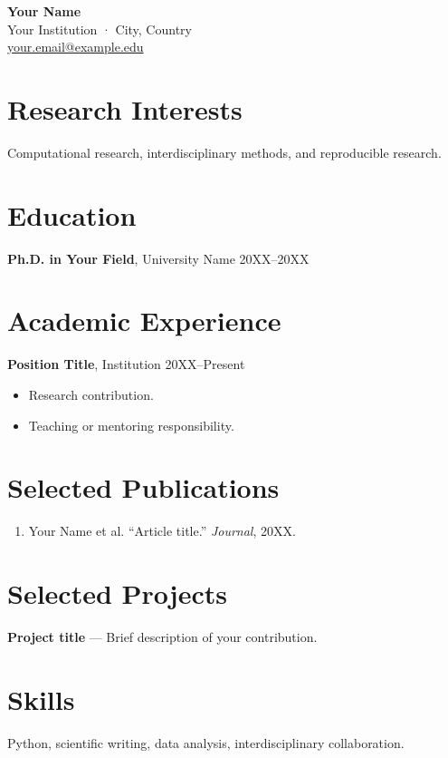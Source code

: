 \documentclass[10pt]{article}
\begin{document}
{\LARGE\textbf{Your Name}}\\
Your Institution · City, Country\\
\href{mailto:your.email@example.edu}{your.email@example.edu}

\section{Research Interests}
Computational research, interdisciplinary methods, and reproducible research.

\section{Education}
\textbf{Ph.D. in Your Field}, University Name \hfill 20XX--20XX

\section{Academic Experience}
\textbf{Position Title}, Institution \hfill 20XX--Present

\begin{itemize}
    \item Research contribution.
    \item Teaching or mentoring responsibility.\end{itemize}

\section{Selected Publications}
\begin{enumerate}
    \item Your Name et al. ``Article title.'' \textit{Journal}, 20XX.
\end{enumerate}

\section{Selected Projects}

\textbf{Project title} — Brief description of your contribution.

\section{Skills}
Python, scientific writing, data analysis, interdisciplinary collaboration.
\end{document}
